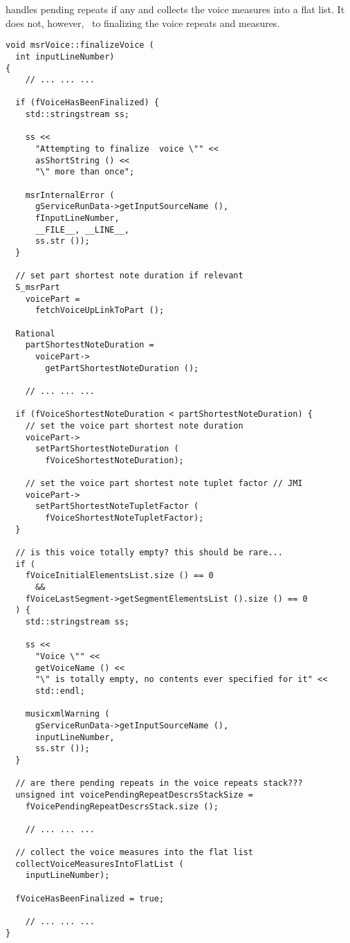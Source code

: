  handles pending repeats if any and collects the voice measures into a flat list. It does not, however, \cascade\ to finalizing the voice repeats and measures.
\begin{lstlisting}[language=CPlusPlus]
void msrVoice::finalizeVoice (
  int inputLineNumber)
{
	// ... ... ...

  if (fVoiceHasBeenFinalized) {
    std::stringstream ss;

    ss <<
      "Attempting to finalize  voice \"" <<
      asShortString () <<
      "\" more than once";

    msrInternalError (
      gServiceRunData->getInputSourceName (),
      fInputLineNumber,
      __FILE__, __LINE__,
      ss.str ());
  }

  // set part shortest note duration if relevant
  S_msrPart
    voicePart =
      fetchVoiceUpLinkToPart ();

  Rational
    partShortestNoteDuration =
      voicePart->
        getPartShortestNoteDuration ();

	// ... ... ...

  if (fVoiceShortestNoteDuration < partShortestNoteDuration) {
    // set the voice part shortest note duration
    voicePart->
      setPartShortestNoteDuration (
        fVoiceShortestNoteDuration);

    // set the voice part shortest note tuplet factor // JMI
    voicePart->
      setPartShortestNoteTupletFactor (
        fVoiceShortestNoteTupletFactor);
  }

  // is this voice totally empty? this should be rare...
  if (
    fVoiceInitialElementsList.size () == 0
      &&
    fVoiceLastSegment->getSegmentElementsList ().size () == 0
  ) {
    std::stringstream ss;

    ss <<
      "Voice \"" <<
      getVoiceName () <<
      "\" is totally empty, no contents ever specified for it" <<
      std::endl;

    musicxmlWarning (
      gServiceRunData->getInputSourceName (),
      inputLineNumber,
      ss.str ());
  }

  // are there pending repeats in the voice repeats stack???
  unsigned int voicePendingRepeatDescrsStackSize =
    fVoicePendingRepeatDescrsStack.size ();

	// ... ... ...

  // collect the voice measures into the flat list
  collectVoiceMeasuresIntoFlatList (
    inputLineNumber);

  fVoiceHasBeenFinalized = true;

	// ... ... ...
}
\end{lstlisting}


